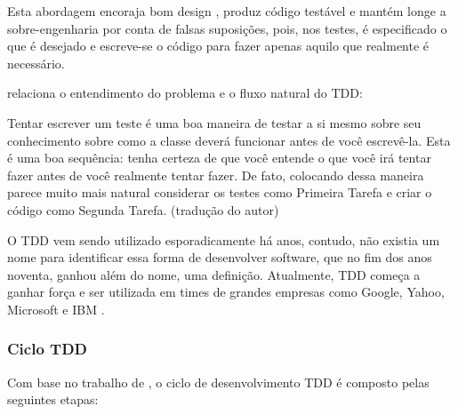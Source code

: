 Esta abordagem encoraja bom design \cite{GrowingOOByTests}, produz código testável e mantém longe a sobre-engenharia por conta de falsas suposições, pois, nos testes, é especificado o que é desejado e escreve-se o código para fazer apenas aquilo que realmente é necessário. \cite{TestDrivenKoskela, TDDbyExample, EmpiricalTDD}

 relaciona o entendimento do problema e o fluxo natural do TDD:

\begin{citacao}
Tentar escrever um teste é uma boa maneira de testar a si mesmo sobre seu conhecimento sobre como a classe deverá funcionar antes de você escrevê-la. Esta é uma boa sequência: tenha certeza de que você entende o que você irá tentar fazer antes de você realmente tentar fazer. De fato, colocando dessa maneira parece muito mais natural considerar os testes como Primeira Tarefa e criar o código como Segunda Tarefa. (tradução do autor)
\end{citacao}

O TDD vem sendo utilizado esporadicamente há anos, contudo, não existia um nome para identificar essa forma de desenvolver software, que no fim dos anos noventa, ganhou além do nome, uma definição. Atualmente, TDD começa a ganhar força e ser utilizada em times de grandes empresas como Google, Yahoo, Microsoft e IBM \cite{EmpiricalTDD}.

\subsubsection{Ciclo TDD}
\label{ssub:ciclo_tdd}

Com base no trabalho de , o ciclo de desenvolvimento TDD é composto pelas seguintes etapas:

